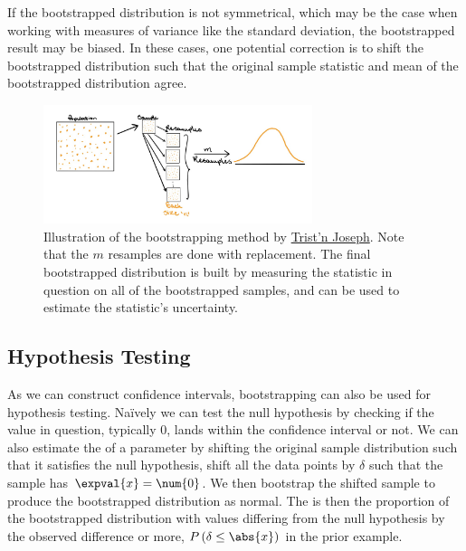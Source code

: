 If the bootstrapped distribution is not symmetrical,
which may be the case when working with measures of variance like the standard deviation,
the bootstrapped result may be biased.
In these cases, one potential correction is to shift the bootstrapped distribution
such that the original sample statistic and mean of the bootstrapped distribution agree.

\begin{figure}
\centering
\includegraphics[width=0.7\textwidth]{figures/stats/bootstrapping.jpeg}
\caption{
Illustration of the bootstrapping method
by \href{https://towardsdatascience.com/bootstrapping-statistics-what-it-is-and-why-its-used-e2fa29577307}{Trist'n Joseph}.
Note that the $m$ resamples are done with replacement.
The final bootstrapped distribution is built by measuring the statistic in question on all of the bootstrapped samples,
and can be used to estimate the statistic's uncertainty.
}
\label{fig:bootstrapping}
\end{figure}

\subsection{Hypothesis Testing}
\label{stats:bootstrapping:hypo}

As we can construct confidence intervals, bootstrapping can also be used for hypothesis testing.
N{a\"i}vely we can test the null hypothesis by checking if the value in question,
typically \num{0}, lands within the confidence interval or not.
We can also estimate the \pvalue of a parameter by shifting the original sample distribution such that
it satisfies the null hypothesis, \eg shift all the data points by $\delta$ such that the sample has $\expval{x} = \num{0}$.
We then bootstrap the shifted sample to produce the bootstrapped distribution as normal.
The \pvalue is then the proportion of the bootstrapped distribution
with values differing from the null hypothesis by the observed difference or more,
\eg $P\left(\delta \leq \abs{x}\right)$ in the prior example.

